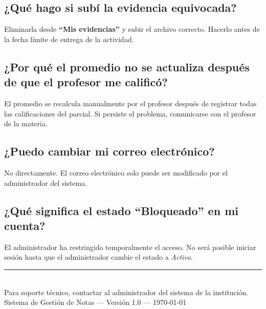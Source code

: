\documentclass[12pt, a4paper]{article}
\begin{document}
\subsection*{¿Qué hago si subí la evidencia equivocada?}
Eliminarla desde \textbf{``Mis evidencias''} y subir el archivo correcto. Hacerlo antes de la fecha límite de entrega de la actividad.

\subsection*{¿Por qué el promedio no se actualiza después de que el profesor me calificó?}
El promedio se recalcula manualmente por el profesor después de registrar todas las calificaciones del parcial. Si persiste el problema, comunicarse con el profesor de la materia.

\subsection*{¿Puedo cambiar mi correo electrónico?}
No directamente. El correo electrónico solo puede ser modificado por el administrador del sistema.

\subsection*{¿Qué significa el estado ``Bloqueado'' en mi cuenta?}
El administrador ha restringido temporalmente el acceso. No será posible iniciar sesión hasta que el administrador cambie el estado a \textit{Activo}.

\vfill
\begin{center}
    \rule{0.5\linewidth}{0.4pt}\\[0.3cm]
    {\small Para soporte técnico, contactar al administrador del sistema de la institución.}\\[0.2cm]
    {\small Sistema de Gestión de Notas --- Versión 1.0 --- \today}
\end{center}
\end{document}
